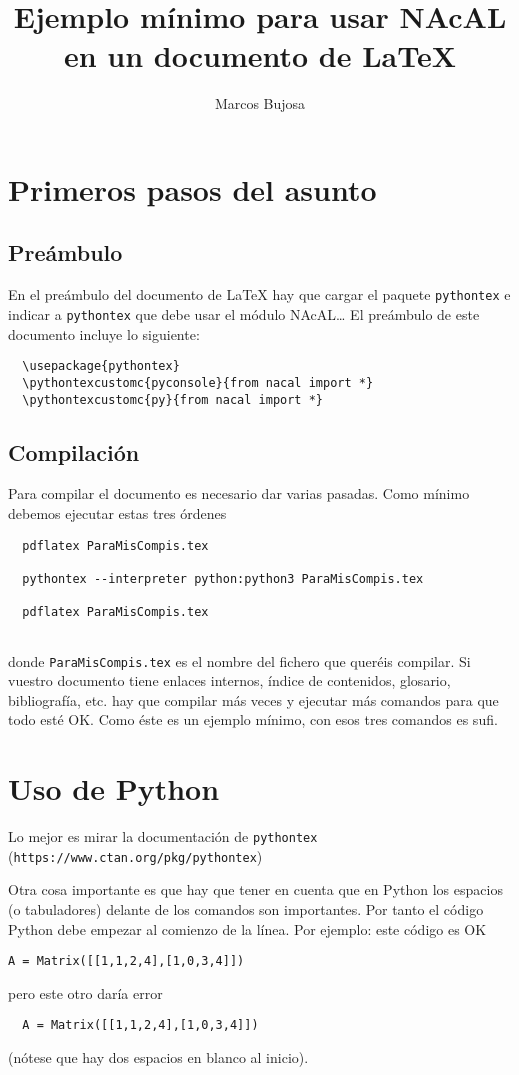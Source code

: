 \documentclass[12pt,a4paper]{article} %
\title{Ejemplo mínimo para usar NAcAL en un documento de \LaTeX{}}
\author{Marcos Bujosa}
\begin{document}
\maketitle
\section{Primeros pasos del asunto}

\subsection{Preámbulo}

En el preámbulo del documento de \LaTeX{} hay que cargar el paquete
\texttt{pythontex} e indicar a \texttt{pythontex} que debe usar el
módulo NAcAL\dots{} El preámbulo de este documento incluye lo
siguiente:
\begin{Verbatim}
  \usepackage{pythontex}
  \pythontexcustomc{pyconsole}{from nacal import *}
  \pythontexcustomc{py}{from nacal import *}
\end{Verbatim}

\subsection{Compilación}
Para compilar el documento es necesario dar varias pasadas. Como
mínimo debemos ejecutar estas tres órdenes
\begin{Verbatim}
  pdflatex ParaMisCompis.tex
  
  pythontex --interpreter python:python3 ParaMisCompis.tex
  
  pdflatex ParaMisCompis.tex
  
\end{Verbatim}
donde \texttt{ParaMisCompis.tex} es el nombre del fichero que queréis
compilar. Si vuestro documento tiene enlaces internos, índice de
contenidos, glosario, bibliografía, etc. hay que compilar más veces y
ejecutar más comandos para que todo esté OK. Como éste es un ejemplo
mínimo, con esos tres comandos es sufi.


\section{Uso de Python}
Lo mejor es mirar la documentación de \texttt{pythontex}\\
(\texttt{https://www.ctan.org/pkg/pythontex})
\medskip

Otra cosa importante es que hay que tener en cuenta que en Python los
espacios (o tabuladores) delante de los comandos son importantes. Por
tanto el código Python debe empezar al comienzo de la línea. Por
ejemplo: este código es OK
\begin{Verbatim}
A = Matrix([[1,1,2,4],[1,0,3,4]])  
\end{Verbatim}
pero este otro daría error
\begin{Verbatim}
  A = Matrix([[1,1,2,4],[1,0,3,4]])  
\end{Verbatim}
(nótese que hay dos espacios en blanco al inicio).  \medskip
\end{document}
